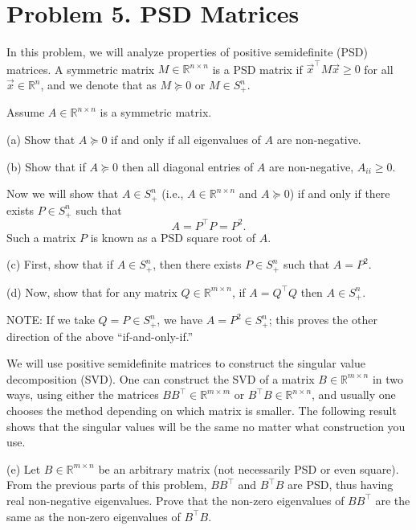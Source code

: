 \documentclass[
  12pt,
]{fphw}
\begin{document}
\newpage
\section*{Problem 5. PSD Matrices}

In this problem, we will analyze properties of positive semidefinite (PSD) matrices. A symmetric matrix
$M \in \mathbb{R}^{n\times n}$ is a PSD matrix if $\vec{x}^\top M \vec{x} \ge 0$ for all $\vec{x} \in \mathbb{R}^n$, and we denote that as
$M \succeq 0$ or $M \in S^n_+$.

Assume $A \in \mathbb{R}^{n\times n}$ is a symmetric matrix.

(a) Show that $A \succeq 0$ if and only if all eigenvalues of $A$ are non-negative.

(b) Show that if $A \succeq 0$ then all diagonal entries of $A$ are non-negative, $A_{ii} \ge 0$.

Now we will show that $A \in S^n_+$ (i.e., $A \in \mathbb{R}^{n\times n}$ and $A \succeq 0$) if and only if there exists $P \in S^n_+$ such that
\[
A = P^\top P = P^2.
\]
Such a matrix $P$ is known as a PSD square root of $A$.

(c) First, show that if $A \in S^n_+$, then there exists $P \in S^n_+$ such that $A = P^2$.

(d) Now, show that for any matrix $Q \in \mathbb{R}^{m\times n}$, if $A = Q^\top Q$ then $A \in S^n_+$.

NOTE: If we take $Q = P \in S^n_+$, we have $A = P^2 \in S^n_+$; this proves the other direction of the above
“if-and-only-if.”

We will use positive semidefinite matrices to construct the singular value decomposition (SVD). One can construct
the SVD of a matrix $B \in \mathbb{R}^{m\times n}$ in two ways, using either the matrices $BB^\top \in \mathbb{R}^{m\times m}$ or $B^\top B \in \mathbb{R}^{n\times n}$, and
usually one chooses the method depending on which matrix is smaller. The following result shows that the
singular values will be the same no matter what construction you use.

(e) Let $B \in \mathbb{R}^{m\times n}$ be an arbitrary matrix (not necessarily PSD or even square). From the previous parts of
this problem, $BB^\top$ and $B^\top B$ are PSD, thus having real non-negative eigenvalues. Prove that the non-zero
eigenvalues of $BB^\top$ are the same as the non-zero eigenvalues of $B^\top B$.
\end{document}
